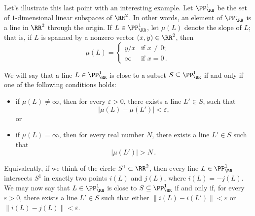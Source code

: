 \begin{exm}%
\label{exm:real_projective_line}
	Let's illustrate this last point with an interesting example.
	Let $\PP^1_{\RR}$ be the set of $1$-dimensional linear subspaces of $\RR^2$.
	In other words, an element of $\PP^1_{\RR}$ is a line in $\RR^2$ through the origin.
	If $L \in \PP^1_{\RR}$, let $\mu(L)$ denote the slope of $L$;
	that is, if $L$ is spanned by a nonzero vector $(x,y) \in \RR^2$, then
	\[
		\mu(L) = \begin{cases}
			y/x & \text{if }x \neq 0\text{;}\\
			\infty & \text{if }x=0 \period
		\end{cases}
	\]

	We will say that a line $L \in \PP^1_{\RR}$ is close to a subset $S \subseteq \PP^1_{\RR}$ if and only if one of the following conditions holds:
	\begin{itemize}
		\item if $\mu(L) \neq \infty$, then for every $\varepsilon>0$, there exists a line $L' \in S$, such that
			\[
				|\mu(L) - \mu(L')| < \varepsilon \comma
			\]
			or
		\item if $\mu(L) = \infty$, then for every real number $N$, there exists a line $L' \in S $ such that
			\[
				|\mu(L')|>N \period
			\]
	\end{itemize}

	Equivalently, if we think of the circle $S^1 \subset \RR^2$, then every line $L \in \PP^1_{\RR}$ intersects $S^1$ in exactly two points%
	$i(L)$ and $j(L)$, where $i(L) = -j(L)$.
	We may now say that $L \in \PP^1_{\RR}$ is close to $S \subseteq \PP^1_{\RR}$ if and only if, for every $\varepsilon>0$, there exists a line $L' \in S$ such that either $\|i(L)-i(L')\|<\varepsilon$ or $\|i(L)-j(L)\|<\varepsilon$.
\end{exm}


